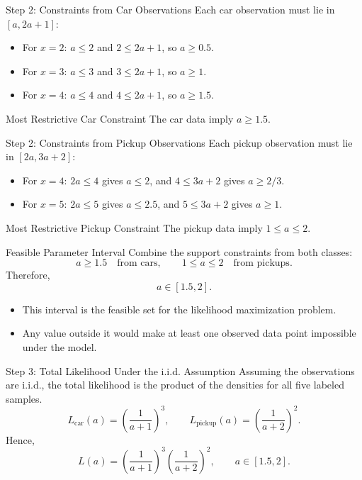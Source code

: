 \documentclass[10pt]{beamer}
\begin{document}
\begin{frame}{Step 2: Constraints from Car Observations}
  \justifying
  Each car observation must lie in $[a,2a+1]$:
  \begin{itemize}
    \item For $x=2$: $a \leq 2$ and $2 \leq 2a+1$, so $a \geq 0.5$.
    \item For $x=3$: $a \leq 3$ and $3 \leq 2a+1$, so $a \geq 1$.
    \item For $x=4$: $a \leq 4$ and $4 \leq 2a+1$, so $a \geq 1.5$.
  \end{itemize}
  \begin{conceptbox}{Most Restrictive Car Constraint}
    The car data imply $a \geq 1.5$.
  \end{conceptbox}
\end{frame}

\begin{frame}{Step 2: Constraints from Pickup Observations}
  \justifying
  Each pickup observation must lie in $[2a,3a+2]$:
  \begin{itemize}
    \item For $x=4$: $2a \leq 4$ gives $a \leq 2$, and $4 \leq 3a+2$ gives $a \geq 2/3$.
    \item For $x=5$: $2a \leq 5$ gives $a \leq 2.5$, and $5 \leq 3a+2$ gives $a \geq 1$.
  \end{itemize}
  \begin{conceptbox}{Most Restrictive Pickup Constraint}
    The pickup data imply $1 \leq a \leq 2$.
  \end{conceptbox}
\end{frame}

\begin{frame}{Feasible Parameter Interval}
  \justifying
  Combine the support constraints from both classes:
  \[
    a \geq 1.5 \quad \text{from cars},
    \qquad
    1 \leq a \leq 2 \quad \text{from pickups}.
  \]
  Therefore,
  \[
    a \in [1.5,2].
  \]
  \begin{itemize}
    \item This interval is the feasible set for the likelihood maximization problem.
    \item Any value outside it would make at least one observed data point impossible under the model.
  \end{itemize}
\end{frame}

\begin{frame}{Step 3: Total Likelihood Under the i.i.d. Assumption}
  \justifying
  Assuming the observations are i.i.d., the total likelihood is the product of the densities for all five labeled samples.
  \[
    L_{\text{car}}(a) = \left(\frac{1}{a+1}\right)^3,
    \qquad
    L_{\text{pickup}}(a) = \left(\frac{1}{a+2}\right)^2.
  \]
  Hence,
  \[
    L(a) = \left(\frac{1}{a+1}\right)^3\left(\frac{1}{a+2}\right)^2,
    \qquad
    a \in [1.5,2].
  \]
\end{frame}
\end{document}

